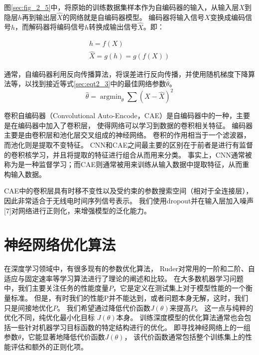 图\ref{sec:fig_2_5}中，将原始的训练数据集样本作为自编码器的输入，从输入层$X$到隐层$h$再到输出层$\hat{X}$的网络就是自编码器模型。
编码器将输入信号$X$变换成编码信号$h$，而解码器将编码信号$h$转换成输出信号$\hat{X}$。即：\par

\begin{equation}
	\begin{gathered}
		h=f(X)
		\\
		\hat{X}=g(h)=g(f(X))
	\end{gathered}
\end{equation}

通常，自编码器利用反向传播算法，将误差进行反向传播，并使用随机梯度下降算法等，以找到接近等式\eqref{sec:eqt2_3}中的最佳网络参数$\hat{\theta}$。
\begin{equation}\label{sec:eqt2_3}
	\hat{\theta} = \mathop{\arg\min}_{\theta} \sum(X − \hat{X})^2
\end{equation}

卷积自编码器（Convolutional Auto-Encode，CAE）是自编码器中的一种，主要是在编码器中加入了卷积层，
使得网络可以学习到数据的卷积相关特征。
编码器主要是由卷积层和池化层交叉组成的神经网络。
卷积的作用相当于一个滤波器，而池化则是提取不变特征。
CNN和CAE之间最主要的区别在于前者是进行有监督的卷积核学习，并且将提取的特征进行组合从而用来分类。
事实上，CNN通常被称为是一种监督学习；而CAE则通常被用来训练从输入数据中提取特征，从而重构输入数据。\par

CAE中的卷积层具有时移不变性以及受约束的参数搜索空间（相对于全连接层），因此非常适合于无线电时间序列信号表示。
我们使用dropout并在输入层加入噪声[7]对网络进行正则化，来增强模型的泛化能力。\par

\section{神经网络优化算法}
在深度学习领域中，有很多现有的参数优化算法，
Ruder对常用的一阶和二阶、自适应与固定速率等学习算法进行了理论的阐述和比较\cite{ruder2016overview}。
在大多数机器学习问题中，我们主要关注任务的性能度量$P$，它是定义在测试集上对于模型性能的一个衡量标准。
但是，有时我们的性能P并不能达到，或者问题本身无解，这时，我们只是间接地优化$P$。
我们希望通过降低代价函数$J(\theta)$来提高$P$。
这一点与纯粹的优化不同，纯优化最小化目标 $J(\theta)$本身。
训练深度模型的优化算法通常也会包括一些针对机器学习目标函数的特定结构进行的优化。
即寻找神经网络上的一组参数$\theta$，它能显著地降低代价函数$J(\theta)$，
该代价函数通常包括整个训练集上的性能评估和额外的正则化项。


